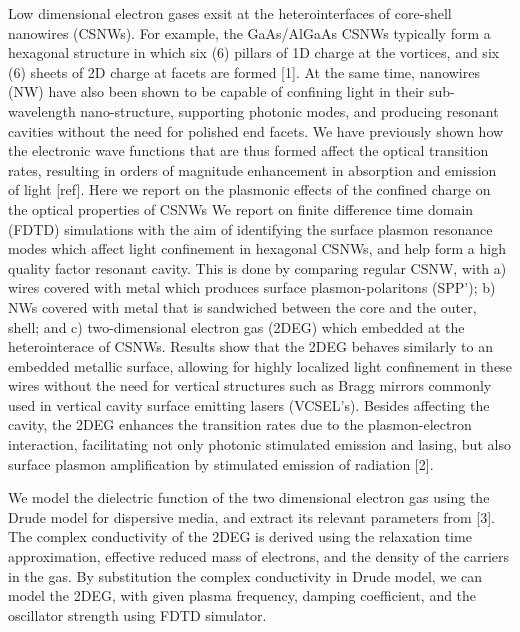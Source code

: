 
Low dimensional electron gases exsit at the heterointerfaces of core-shell
nanowires (CSNWs). For example, the GaAs/AlGaAs CSNWs typically form a
hexagonal structure in which six (6) pillars of 1D charge at the vortices, and
six (6) sheets of 2D charge at facets  are formed [1]. At the same time,
nanowires (NW) have also been shown to be capable of confining light in their
sub-wavelength nano-structure, supporting photonic modes, and producing
resonant cavities without the need for polished end facets. We have previously
shown how the electronic wave functions that are thus formed affect the optical
transition rates, resulting in orders of magnitude  enhancement in absorption
and emission of light [ref]. Here we report on the plasmonic effects of the
confined charge on the optical properties of CSNWs We report on finite
difference time domain (FDTD) simulations with the aim of identifying the
surface plasmon resonance modes which affect light confinement in hexagonal
CSNWs, and help form a  high quality factor resonant cavity. This is done by
comparing regular CSNW, with a) wires covered with metal which produces surface
plasmon-polaritons (SPP’); b) NWs covered with metal that is sandwiched between
the core and the outer, shell; and c) two-dimensional electron gas (2DEG)
which  embedded at the heterointerace of CSNWs. Results show that the 2DEG
behaves similarly to an embedded metallic surface, allowing for highly
localized light confinement in these wires without the need for vertical
structures such as Bragg mirrors commonly used in vertical cavity surface
emitting lasers (VCSEL’s). Besides affecting the cavity, the 2DEG enhances  the
transition rates due to the plasmon-electron interaction, facilitating not only
photonic stimulated emission and lasing, but also  surface plasmon
amplification by stimulated emission of radiation [2].

We model the dielectric function of the two dimensional electron gas using the
Drude model for dispersive media, and extract its relevant parameters from [3].
The complex conductivity of the 2DEG is derived using the relaxation time
approximation, effective reduced mass of electrons, and the density of the
carriers in the gas. By substitution the complex conductivity in Drude model,
we can model the 2DEG, with given plasma frequency, damping coefficient, and
the oscillator strength using FDTD simulator.

